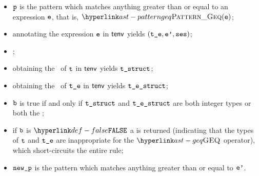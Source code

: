 \ProseParagraph
\AllApply
\begin{itemize}
\item $\vp$ is the pattern which matches anything greater than or equal to an expression $\ve$,
      that is, $\PatternGeq(\ve)$;
\item annotating the expression $\ve$ in $\tenv$ yields $(\vte, \vep, \vses)$\ProseOrTypeError;
\item \Prosechecksymbolicallyevaluable{$\vses$};
\item obtaining the \underlyingtype\ of $\vt$ in $\tenv$ yields $\vtstruct$\ProseOrTypeError;
\item obtaining the \underlyingtype\ of $\vte$ in $\tenv$ yields $\testruct$\ProseOrTypeError;
\item $\vb$ is true if and only if $\vtstruct$ and $\testruct$ are both integer types or both the \realtypeterm{};
\item if $\vb$ is $\False$ a \typingerrorterm{} is returned (indicating that the types of $\vt$ and $\vte$
      are inappropriate for the $\GEQ$ operator),
      which short-circuits the entire rule;
\item $\newp$ is the pattern which matches anything greater than or equal to $\vep$.
\end{itemize}
\FormallyParagraph
\begin{mathpar}
\end{mathpar}

